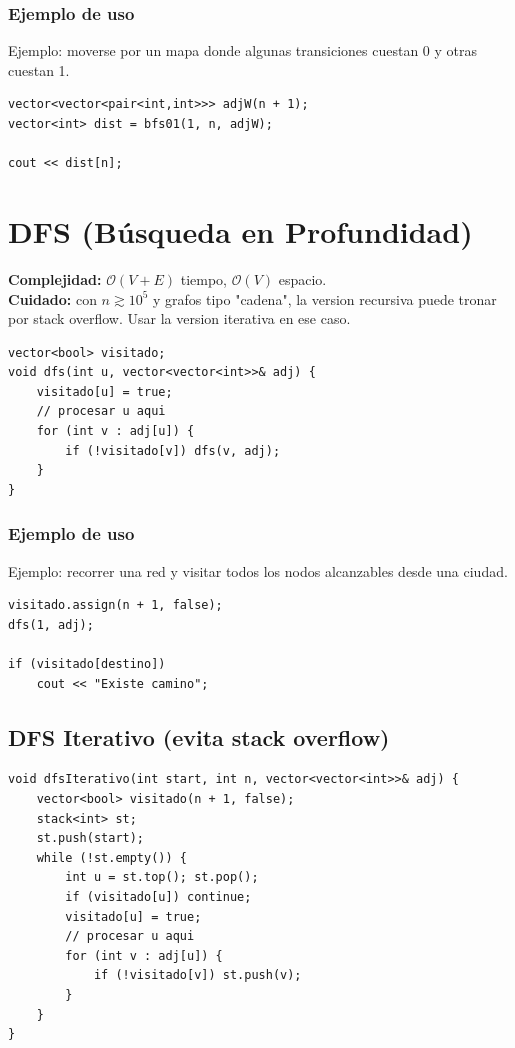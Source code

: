 \documentclass[10pt,twocolumn,letterpaper]{report}
\begin{document}
\subsubsection*{Ejemplo de uso}
Ejemplo: moverse por un mapa donde algunas transiciones cuestan 0 y otras cuestan 1.
\begin{lstlisting}
vector<vector<pair<int,int>>> adjW(n + 1);
vector<int> dist = bfs01(1, n, adjW);

cout << dist[n];
\end{lstlisting}


\section{DFS (Búsqueda en Profundidad)}
\textbf{Complejidad:} $\mathcal{O}(V + E)$ tiempo, $\mathcal{O}(V)$ espacio. \\
\textbf{Cuidado:} con $n \gtrsim 10^5$ y grafos tipo "cadena", la version recursiva puede tronar por stack overflow. Usar la version iterativa en ese caso.
\begin{lstlisting}
vector<bool> visitado;
void dfs(int u, vector<vector<int>>& adj) {
    visitado[u] = true;
    // procesar u aqui
    for (int v : adj[u]) {
        if (!visitado[v]) dfs(v, adj);
    }
}
\end{lstlisting}
\subsubsection*{Ejemplo de uso}
Ejemplo: recorrer una red y visitar todos los nodos alcanzables desde una ciudad.
\begin{lstlisting}
visitado.assign(n + 1, false);
dfs(1, adj);

if (visitado[destino])
    cout << "Existe camino";
\end{lstlisting}


\subsection{DFS Iterativo (evita stack overflow)}
\begin{lstlisting}
void dfsIterativo(int start, int n, vector<vector<int>>& adj) {
    vector<bool> visitado(n + 1, false);
    stack<int> st;
    st.push(start);
    while (!st.empty()) {
        int u = st.top(); st.pop();
        if (visitado[u]) continue;
        visitado[u] = true;
        // procesar u aqui
        for (int v : adj[u]) {
            if (!visitado[v]) st.push(v);
        }
    }
}
\end{lstlisting}
\end{document}
